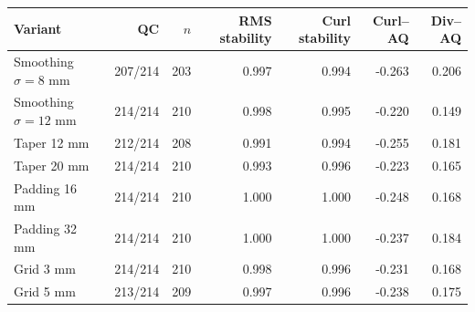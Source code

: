 \begin{tabular}{lrrrrrr}
\toprule
Variant & QC & $n$ & RMS stability & Curl stability & Curl--AQ & Div--AQ \\
\midrule
Smoothing $\sigma=8$ mm & 207/214 & 203 & 0.997 & 0.994 & -0.263 & 0.206 \\
Smoothing $\sigma=12$ mm & 214/214 & 210 & 0.998 & 0.995 & -0.220 & 0.149 \\
Taper 12 mm & 212/214 & 208 & 0.991 & 0.994 & -0.255 & 0.181 \\
Taper 20 mm & 214/214 & 210 & 0.993 & 0.996 & -0.223 & 0.165 \\
Padding 16 mm & 214/214 & 210 & 1.000 & 1.000 & -0.248 & 0.168 \\
Padding 32 mm & 214/214 & 210 & 1.000 & 1.000 & -0.237 & 0.184 \\
Grid 3 mm & 214/214 & 210 & 0.998 & 0.996 & -0.231 & 0.168 \\
Grid 5 mm & 213/214 & 209 & 0.997 & 0.996 & -0.238 & 0.175 \\
\bottomrule
\end{tabular}
